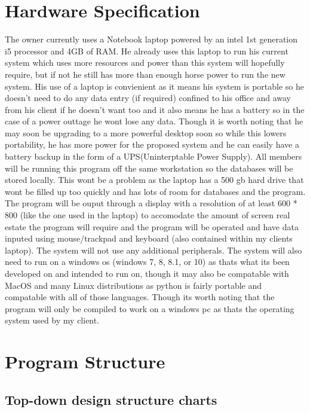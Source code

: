 \section{Hardware Specification}

The owner currently uses a Notebook laptop powered by an intel 1st generation
i5 processor and 4GB of RAM. He already uses this laptop to run his current
system which uses more resources and power than this system will hopefully
require, but if not he still has more than enough horse power to run the new
system. His use of a laptop is convienient as it means his system is portable
so he doesn’t need to do any data entry (if required) confined to his office and
away from his client if he doesn’t want too and it also means he has a battery so
in the case of a power outtage he wont lose any data. Though it is worth noting
that he may soon be upgrading to a more powerful desktop soon so while this
lowers portability, he has more power for the proposed system and he can easily
have a battery backup in the form of a UPS(Uninterptable Power Supply).
All members will be running this program off the same workstation so the
databases will be stored locally. This wont be a problem as the laptop has a 500 gb hard drive that wont be filled up too quickly and has lots of room for databases and the program. The program will be ouput through a display with a resolution of at least 600 * 800 (like the one used in the laptop) to accomodate the amount of screen real estate the program will require and the program will be operated and have data inputed using mouse/trackpad and keyboard (also contained within my clients laptop). The system will not use any additional peripherals. The system will also need to run on a windows os (windows 7, 8, 8.1, or 10) as thats what its been developed on and intended to run on, though it may also be compatable with MacOS and many Linux distributions as python is fairly portable and compatable with all of those languages. Though its worth noting that the program will only be compiled to work on a windows pc as thats the operating system used by my client.



\section{Program Structure}

\subsection{Top-down design structure charts}

